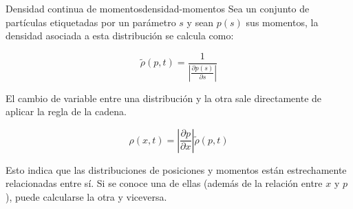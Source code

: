 \begin{definicion}{Densidad continua de momentos}{densidad-momentos}
Sea un conjunto de partículas etiquetadas por un parámetro $s$ y sean $p(s)$ sus momentos, la densidad asociada a esta distribución se calcula como:

\[\tilde\rho(p,t)=\frac1{\left|\frac{\partial p(s)}{\partial s}\right|}\] 
\end{definicion}

El cambio de variable entre una distribución y la otra sale directamente de aplicar la regla de la cadena.

\[\rho(x,t)=\left|\frac{\partial p}{\partial x}\right|\tilde\rho(p,t)\]

Esto indica que las distribuciones de posiciones y momentos están estrechamente relacionadas entre sí. Si se conoce una de ellas (además de la relación entre $x$ y $p$), puede calcularse la otra y viceversa. 

